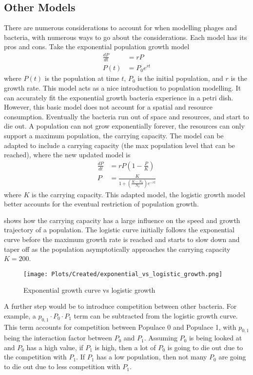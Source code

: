 \subsection{Other Models}
There are numerous considerations to account for when modelling phages and bacteria, with numerous ways to go about the considerations. 
Each model has its pros and cons. 
Take the exponential population growth model 
\begin{align}
    \frac{dP}{dt} &= rP \\
    P(t) &= P_0e^{rt} 
\end{align}
where $P(t)$ is the population at time $t$, $P_0$ is the initial population, and $r$ is the growth rate. 
This model acts as a nice introduction to population modelling. It can accurately fit the exponential growth bacteria experience in a petri dish. 
However, this basic model does not account for a spatial and resource consumption. 
Eventually the bacteria run out of space and resources, and start to die out. 
A population can not grow exponentially forever, the resources can only support a maximum population, the carrying capacity. 
The model can be adapted to include a carrying capacity (the max population level that can be reached), where the new updated model is 
\begin{align}
    \frac{dP}{dt} &= rP(1-\frac{P}{K}) \\ 
    P &= \frac{K}{1 + (\frac{K-N_0}{N_0})e^{-rt}}
\end{align}
where $K$ is the carrying capacity. This adapted model, the logistic growth model better accounts for the eventual restriction of population growth. 

 shows how the carrying capacity has a large influence on the speed and growth trajectory of a population. 
The logistic curve initially follows the exponential curve before the maximum growth rate is reached and starts to slow down and taper off as the population asymptotically approaches the carrying capacity $K=200$. 

\begin{figure}
    \centering
    \texttt{[image: Plots/Created/exponential\_vs\_logistic\_growth.png]}
    \caption{Exponential growth curve vs logistic growth}
    \label{fig:created:exponential_vs_logistic_growth}
\end{figure}

A further step would be to introduce competition between other bacteria. 
For example, a $p_{0, 1}\cdot P_0 \cdot P_1$ term can be subtracted from the logistic growth curve. 
This term accounts for competition between Populace 0 and Populace 1, with $p_{0, 1}$ being the interaction factor between $P_0$ and $P_1$. 
Assuming $P_0$ is being looked at and $P_0$ has a high value, if $P_1$ is high, then a lot of $P_0$ is going to die out due to the competition with $P_1$. 
If $P_1$ has a low population, then not many $P_0$ are going to die out due to less competition with $P_1$. \\ 

